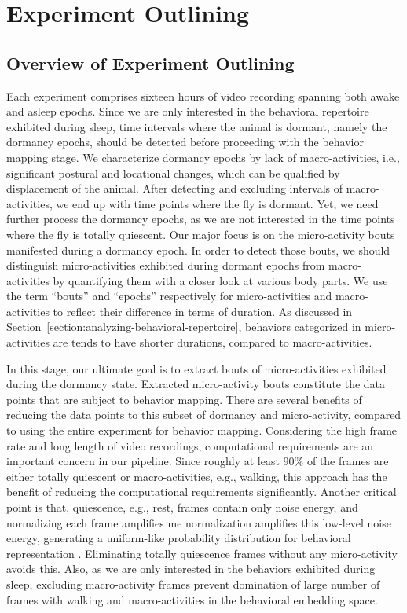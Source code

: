 \chapter{Experiment Outlining}

\section{Overview of Experiment Outlining}
Each experiment comprises sixteen hours of video recording spanning both awake and asleep epochs.
Since we are only interested in the behavioral repertoire exhibited during sleep, time intervals where the animal is dormant, namely the dormancy epochs, should be detected before proceeding with the behavior mapping stage.
We characterize dormancy epochs by lack of macro-activities, i.e., significant postural and locational changes, which can be qualified by displacement of the animal.
After detecting and excluding intervals of macro-activities, we end up with time points where the fly is dormant.
Yet, we need further process the dormancy epochs, as we are not interested in the time points where the fly is totally quiescent.
Our major focus is on the micro-activity bouts manifested during a dormancy epoch.
In order to detect those bouts, we should distinguish micro-activities exhibited during dormant epochs from macro-activities by quantifying them with a closer look at various body parts. We use the term ``bouts'' and ``epochs'' respectively for micro-activities and macro-activities to reflect their difference in terms of duration. As discussed in Section~\ref{section:analyzing-behavioral-repertoire}, behaviors categorized in micro-activities are tends to have shorter durations, compared to macro-activities.

In this stage, our ultimate goal is to extract bouts of micro-activities exhibited during the dormancy state.
Extracted micro-activity bouts constitute the data points that are subject to behavior mapping.
There are several benefits of reducing the data points to this subset of dormancy and micro-activity, compared to using the entire experiment for behavior mapping.
Considering the high frame rate and long length of video recordings, computational requirements are an important concern in our pipeline.
Since roughly at least $90\%$ of the frames are either totally quiescent or macro-activities, e.g., walking, this approach has the benefit of reducing the computational requirements significantly.
Another critical point is that, quiescence, e.g., rest, frames contain only noise energy, and normalizing each frame amplifies me normalization amplifies this low-level noise energy, generating a uniform-like probability distribution for behavioral representation \citep{todd_systematic_2017}.
Eliminating totally quiescence frames without any micro-activity avoids this.
Also, as we are only interested in the behaviors exhibited during sleep, excluding macro-activity frames prevent domination of large number of frames with walking and macro-activities in the behavioral embedding space.

